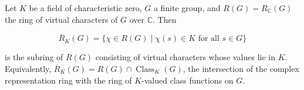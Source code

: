 Let $K$ be a field of characteristic zero, $G$ a finite group, and $R(G) = R_{\mathbb{C}}(G)$ the ring of virtual characters of $G$ over $\mathbb{C}$. Then

$$\overline{R}_K(G) = \{\chi \in R(G) \mid \chi(s) \in K \text{ for all } s \in G\}$$

is the subring of $R(G)$ consisting of virtual characters whose values lie in $K$. Equivalently, $\overline{R}_K(G) = R(G) \cap \operatorname{Class}_K(G)$, the intersection of the complex representation ring with the ring of $K$-valued class functions on $G$.

